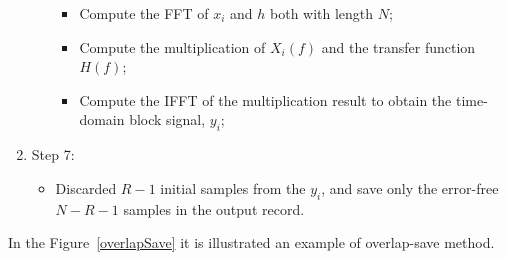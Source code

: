 \documentclass[a4paper]{article}
\begin{document}
\begin{enumerate}
\begin{itemize}
\begin{itemize}
            \item   Compute the FFT of $x_i$ and $h$ both with length $N$;
            \item   Compute the multiplication of $X_i(f)$ and the transfer function $H(f)$;
            \item   Compute the IFFT of the multiplication result to obtain the time-domain block signal, $y_i$;
        \end{itemize}     
    \end{itemize}
    \item   Step 7:
    \begin{itemize}
        \item   Discarded $R-1$ initial samples from the $y_i$, and save only the error-free $N-R-1$ samples in the output record.
    \end{itemize}
\end{enumerate}
In the Figure~\ref{overlapSave} it is illustrated an example of overlap-save method.
\end{document}
